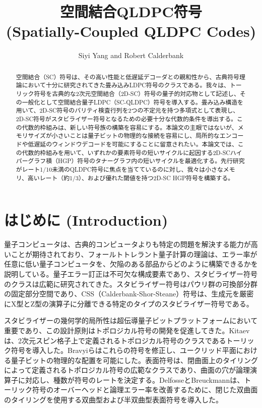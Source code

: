 \documentclass[a4paper,11pt]{article}
\title{空間結合QLDPC符号 \\ (Spatially-Coupled QLDPC Codes)}
\author{Siyi Yang and Robert Calderbank}
\date{}
\begin{document}
\maketitle

\begin{abstract}
空間結合（SC）符号は、その高い性能と低遅延デコーダとの親和性から、古典符号理論において十分に研究されてきた畳み込みLDPC符号のクラスである。我々は、トーリック符号を古典的な2次元空間結合（2D-SC）符号の量子的対応物として記述し、その一般化として空間結合量子LDPC（SC-QLDPC）符号を導入する。畳み込み構造を用いて、2D-SC符号のパリティ検査行列を2つの不定元を持つ多項式として表現し、2D-SC符号がスタビライザー符号となるための必要十分な代数的条件を導出する。この代数的枠組みは、新しい符号族の構築を容易にする。本論文の主眼ではないが、メモリサイズが小さいことは量子ビットの物理的な接続を容易にし、局所的なエンコードや低遅延のウィンドウデコードを可能にすることに留意されたい。本論文では、この代数的枠組みを用いて、いずれかの要素符号の短いサイクルに起因する2D-SCハイパーグラフ積（HGP）符号のタナーグラフ内の短いサイクルを最適化する。先行研究がレート1/10未満のQLDPC符号に焦点を当てているのに対し、我々は小さなメモリ、高いレート（約1/3）、および優れた閾値を持つ2D-SC HGP符号を構築する。
\end{abstract}

\section{はじめに (Introduction)}
量子コンピュータは、古典的コンピュータよりも特定の問題を解決する能力が高いことが期待されており、フォールトトレラント量子計算の理論は、エラー率が任意に低い量子コンピュータを、欠陥のある部品からどのように構築できるかを説明している。量子エラー訂正は不可欠な構成要素であり、スタビライザー符号のクラスは広範に研究されてきた。スタビライザー符号はパウリ群の可換部分群の固定部分空間であり、CSS（Calderbank-Shor-Steane）符号は、生成元を厳密にX型とZ型の演算子に分離できる特定のタイプのスタビライザー符号である。

スタビライザーの幾何学的局所性は超伝導量子ビットプラットフォームにおいて重要であり、この設計原則はトポロジカル符号の開発を促進してきた。Kitaevは、2次元スピン格子上で定義されるトポロジカル符号のクラスであるトーリック符号を導入した。Bravyiらはこれらの符号を修正し、ユークリッド平面における量子ビットの物理的な配置を可能にした。表面符号は、閉曲面上のタイリングによって定義されるトポロジカル符号の広範なクラスであり、曲面の穴が論理演算子に対応し、種数が符号のレートを決定する。DelfosseとBreuckmannは、トーリック符号のオーバーヘッドと論理エラー率を改善するために、閉じた双曲面のタイリングを使用する双曲型および半双曲型表面符号を導入した。
\end{document}
